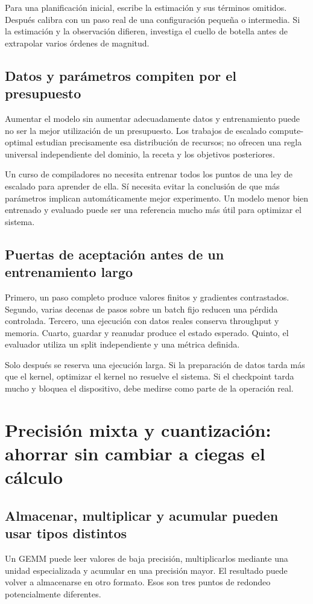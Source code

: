 \documentclass[12pt,a4paper,oneside]{report}
\begin{document}
Para una planificación inicial, escribe la estimación y sus términos omitidos. Después calibra con un paso real de una configuración pequeña o intermedia. Si la estimación y la observación difieren, investiga el cuello de botella antes de extrapolar varios órdenes de magnitud.

\section{Datos y parámetros compiten por el presupuesto}
Aumentar el modelo sin aumentar adecuadamente datos y entrenamiento puede no ser la mejor utilización de un presupuesto. Los trabajos de escalado compute-optimal estudian precisamente esa distribución de recursos; no ofrecen una regla universal independiente del dominio, la receta y los objetivos posteriores. \cite{chinchilla}

Un curso de compiladores no necesita entrenar todos los puntos de una ley de escalado para aprender de ella. Sí necesita evitar la conclusión de que más parámetros implican automáticamente mejor experimento. Un modelo menor bien entrenado y evaluado puede ser una referencia mucho más útil para optimizar el sistema.

\section{Puertas de aceptación antes de un entrenamiento largo}
Primero, un paso completo produce valores finitos y gradientes contrastados. Segundo, varias decenas de pasos sobre un batch fijo reducen una pérdida controlada. Tercero, una ejecución con datos reales conserva throughput y memoria. Cuarto, guardar y reanudar produce el estado esperado. Quinto, el evaluador utiliza un split independiente y una métrica definida.

Solo después se reserva una ejecución larga. Si la preparación de datos tarda más que el kernel, optimizar el kernel no resuelve el sistema. Si el checkpoint tarda mucho y bloquea el dispositivo, debe medirse como parte de la operación real.

\chapter{Precisión mixta y cuantización: ahorrar sin cambiar a ciegas el cálculo}
\label{ch:precision-mixta}
\section{Almacenar, multiplicar y acumular pueden usar tipos distintos}
Un GEMM puede leer valores de baja precisión, multiplicarlos mediante una unidad especializada y acumular en una precisión mayor. El resultado puede volver a almacenarse en otro formato. Esos son tres puntos de redondeo potencialmente diferentes.
\end{document}
